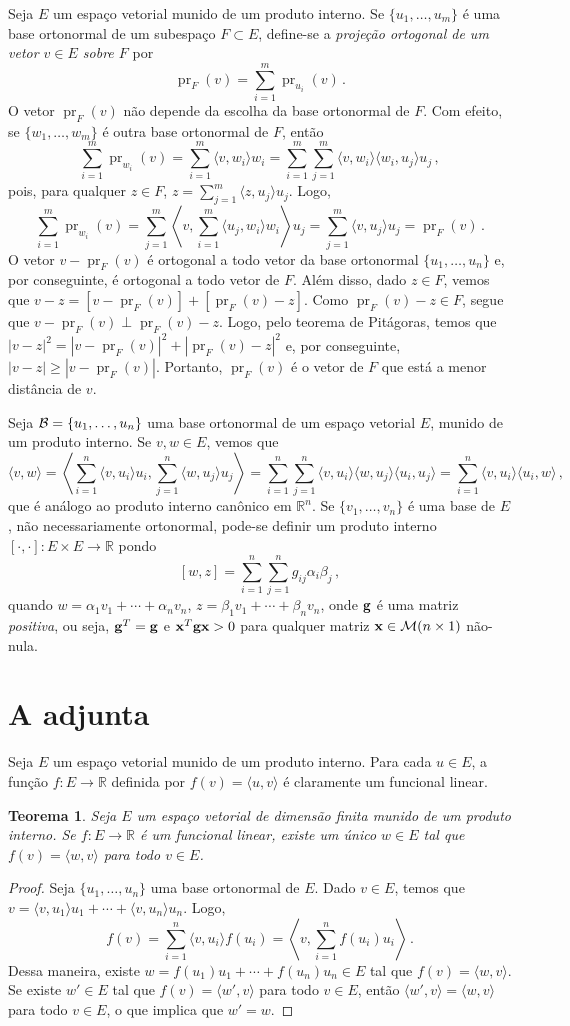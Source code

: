 \documentclass[12pt,a4paper]{article}
\newcommand{\ang}[1]{\langle#1\rangle}
\newcommand{\dang}[1]{\left\langle#1\right\rangle}
\newcommand{\R}{\mathbb{R}}
\newtheorem{thm}{Teorema}[section]
\theoremstyle{definition}
\DeclareMathOperator{\pr}{pr}
\begin{document}
Seja $E$ um espaço vetorial munido de um produto interno. Se
$\{u_1,\ldots,u_m\}$ é uma base ortonormal de um subespaço
$F\subset E$, define-se a \textit{projeção ortogonal de um vetor
  $v\in E$ sobre $F$} por
$$\pr_F(v)=\sum_{i=1}^m\pr_{u_i}(v)\,.$$
O vetor $\pr_F(v)$ não depende da escolha da base ortonormal de
$F$. Com efeito, se $\{w_1,\ldots,w_m\}$ é outra base ortonormal de
$F$, então
$$\sum_{i=1}^m\pr_{w_i}(v)=\sum_{i=1}^m\ang{v,w_i}w_i=\sum_{i=1}^m\sum_{j=1}^m\ang{v,w_i}\ang{w_i,u_j}u_j\,,$$
pois, para qualquer $z\in F$, $z=\sum_{j=1}^m\ang{z,u_j}u_j$. Logo,
$$\sum_{i=1}^m\pr_{w_i}(v)=\sum_{j=1}^m\dang{v,\sum_{i=1}^m\ang{u_j,w_i}w_i}u_j=\sum_{j=1}^m\ang{v,u_j}u_j=\pr_F(v)\,.$$
O vetor $v-\pr_F(v)$ é ortogonal a todo vetor da base ortonormal
$\{u_1,\ldots,u_n\}$ e, por conseguinte, é ortogonal a todo vetor de
$F$. Além disso, dado $z\in F$, vemos que
$v-z=[v-\pr_F(v)]+[\pr_F(v)-z]$. Como $\pr_F(v)-z\in F$, segue que
$v-\pr_F(v)\perp \pr_F(v)-z$. Logo, pelo teorema de Pitágoras, temos
que $|v-z|^2=|v-\pr_F(v)|^2+|\pr_F(v)-z|^2$ e, por conseguinte,
$|v-z|\ge |v-\pr_F(v)|$. Portanto, $\pr_F(v)$ é o vetor de $F$ que
está a menor distância de $v$.

Seja ${\cal B}=\{u_1,\ldots,u_n\}$ uma base ortonormal de um espaço
vetorial $E$, munido de um produto interno. Se $v,w\in E$, vemos que
$$\ang{v,w}=\dang{\sum_{i=1}^n\ang{v,u_i}u_i,\sum_{j=1}^n\ang{w,u_j}u_j}=\sum_{i=1}^n\sum_{j=1}^n\ang{v,u_i}\ang{w,u_j}\ang{u_i,u_j}=\sum_{i=1}^n\ang{v,u_i}\ang{u_i,w}\,,$$
que é análogo ao produto interno canônico em $\R^n$. Se
$\{v_1,\ldots,v_n\}$ é uma base de $E$, não necessariamente
ortonormal, pode-se definir um produto interno
$[\cdot,\cdot]:E\times E\to\R$ pondo
$$[w,z]=\sum_{i=1}^n\sum_{j=1}^ng_{ij}\alpha_i\beta_j\,,$$
quando $w=\alpha_1v_1+\cdots+\alpha_nv_n$,
$z=\beta_1v_1+\cdots+\beta_nv_n$, onde ${\bf g}$ é uma matriz
\textit{positiva}, ou seja, ${\bf g}^T={\bf g}$ e
${\bf x}^T{\bf gx}>0$ para qualquer matriz
${\bf x}\in{\cal M}(n\times 1)$ não-nula.

\section{A adjunta}

Seja $E$ um espaço vetorial munido de um produto interno. Para cada
$u\in E$, a função $f:E\to\R$ definida por $f(v)=\ang{u,v}$ é
claramente um funcional linear.

\begin{thm}
  \label{thm:15}
  Seja $E$ um espaço vetorial de dimensão finita munido de um produto
  interno. Se $f:E\to\R$ é um funcional linear, existe um único
  $w\in E$ tal que $f(v)=\ang{w,v}$ para todo $v\in E$.
\end{thm}
\begin{proof}
  Seja $\{u_1,\ldots,u_n\}$ uma base ortonormal de $E$. Dado $v\in E$,
  temos que $v=\ang{v,u_1}u_1+\cdots+\ang{v,u_n}u_n$. Logo,
  $$f(v)=\sum_{i=1}^n\ang{v,u_i}f(u_i)=\dang{v,\sum_{i=1}^nf(u_i)u_i}\,.$$
  Dessa maneira, existe $w=f(u_1)u_1+\cdots+f(u_n)u_n\in E$ tal que
  $f(v)=\ang{w,v}$. Se existe $w'\in E$ tal que $f(v)=\ang{w',v}$ para
  todo $v\in E$, então $\ang{w',v}=\ang{w,v}$ para todo $v\in E$, o
  que implica que $w'=w$.
\end{proof}
\end{document}
